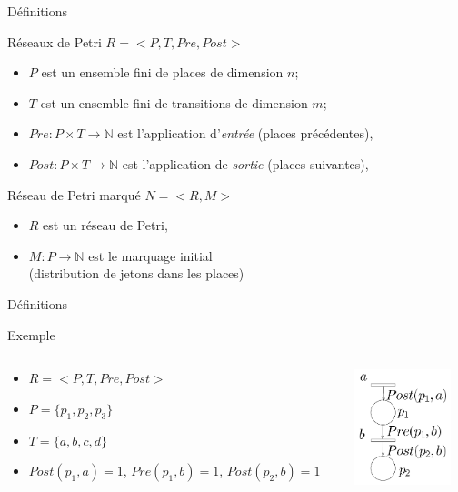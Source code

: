 \documentclass[compress]{beamer}
\begin{document}
\begin{frame}{Définitions}
\begin{block}{Réseaux de Petri $R = <\!P, T, Pre, Post\!>$}
	\begin{itemize}
	\item $P$ est un ensemble fini de places de dimension $n$;
	\item $T$ est un ensemble fini de transitions de dimension $m$;
	\item $Pre : P \times T \rightarrow \mathbb{N}$ est l'application d'{\it entrée} (places précédentes),
	\item $Post:P \times T \rightarrow \mathbb{N}$ est l'application de {\it sortie} (places suivantes),
	\end{itemize}
\end{block}
\begin{block}{Réseau de Petri marqué $N = <\!R,M\!>$}
	\begin{itemize}
	\item $R$ est un réseau de Petri,
	\item $M : P \rightarrow \mathbb{N}$ est le marquage initial \\
		(distribution de jetons dans les places)
	\end{itemize}
\end{block}
\end{frame}

\begin{frame}{Définitions}
\begin{block}{Exemple}
\begin{columns}
	\begin{column}{.7\textwidth}
		\begin{itemize}
		\item $R = <\!P, T, Pre, Post\!>$\\
		\item $P=\{p_1,p_2,p_3\}$
		\item $T=\{a,b,c,d\}$
		\item $Post(p_1,a)=1$, $Pre(p_1,b)=1$, $Post(p_2,b)=1$
		\end{itemize}
	\end{column}
	\begin{column}{.3\textwidth}
		\includegraphics[width=2.8cm]{pre}
	\end{column}	
\end{columns}
\end{block}
\end{frame}
\end{document}
